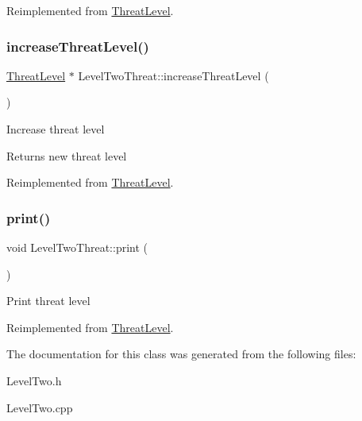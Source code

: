 Reimplemented from \hyperlink{classThreatLevel_a3545ec161fbe4c01beafb9b43624c7e8}{Threat\+Level}.

\mbox{\label{classLevelTwoThreat_a54b4d396cdd27504f1a8063c04be5bcf}} 
\subsubsection{\texorpdfstring{increase\+Threat\+Level()}{increaseThreatLevel()}}
{\footnotesize\ttfamily \hyperlink{classThreatLevel}{Threat\+Level} $\ast$ Level\+Two\+Threat\+::increase\+Threat\+Level (\begin{DoxyParamCaption}{ }\end{DoxyParamCaption})\hspace{0.3cm}{\ttfamily [virtual]}}

Increase threat level \begin{DoxyReturn}{Returns}
new threat level 
\end{DoxyReturn}


Reimplemented from \hyperlink{classThreatLevel_ae18f6ebe2186ae1b61d4817196f969e3}{Threat\+Level}.

\mbox{\label{classLevelTwoThreat_a9e21bc1a55bb25d86346c484f5fd0525}} 
\subsubsection{\texorpdfstring{print()}{print()}}
{\footnotesize\ttfamily void Level\+Two\+Threat\+::print (\begin{DoxyParamCaption}{ }\end{DoxyParamCaption})\hspace{0.3cm}{\ttfamily [virtual]}}

Print threat level 

Reimplemented from \hyperlink{classThreatLevel_a5bdff5eeffed8db616ca06091097c138}{Threat\+Level}.



The documentation for this class was generated from the following files\+:\begin{DoxyCompactItemize}
\item 
Level\+Two.\+h\item 
Level\+Two.\+cpp\end{DoxyCompactItemize}
